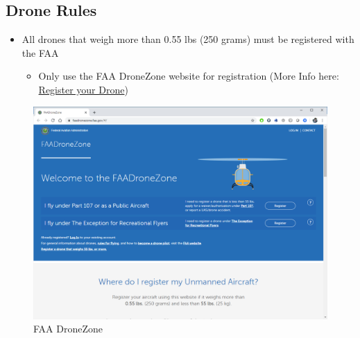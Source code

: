 \documentclass[
  12pt,
]{book}
\providecommand{\tightlist}{%
  \setlength{\itemsep}{0pt}\setlength{\parskip}{0pt}}
\begin{document}
\subsection{Drone Rules}\label{drone-rules}

\begin{itemize}
\tightlist
\item
  All drones that weigh more than 0.55 lbs (250 grams) must be registered with the FAA

  \begin{itemize}
  \tightlist
  \item
    Only use the FAA DroneZone website for registration (More Info here: \hyperref[registration]{Register your Drone})
  \end{itemize}
\end{itemize}

\begin{figure}

{\centering \includegraphics[width=0.8\linewidth]{images/reg_site} 

}

\caption{FAA DroneZone}\label{fig:reg-page2}
\end{figure}
\end{document}
